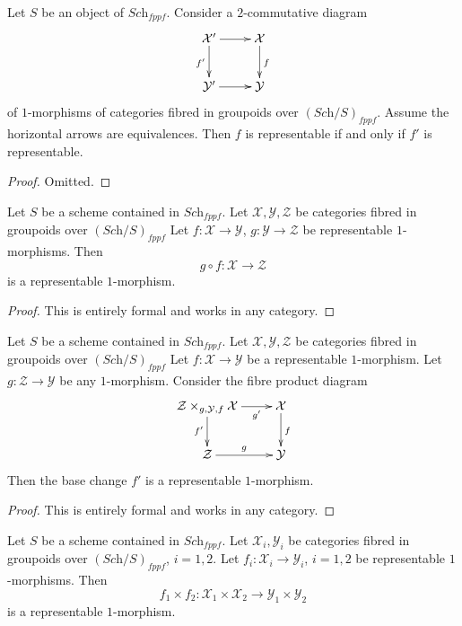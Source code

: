 \begin{lemma}
\label{lemma-representable-morphism-equivalent}
Let $S$ be an object of $\textit{Sch}_{fppf}$.
Consider a $2$-commutative diagram
$$
\xymatrix{
\mathcal{X}' \ar[r] \ar[d]_{f'} & \mathcal{X} \ar[d]^f \\
\mathcal{Y}' \ar[r] & \mathcal{Y}
}
$$
of $1$-morphisms of categories fibred in groupoids over
$(\textit{Sch}/S)_{fppf}$.
Assume the horizontal arrows are equivalences.
Then $f$ is representable if and only if $f'$ is representable.
\end{lemma}

\begin{proof}
Omitted.
\end{proof}

\begin{lemma}
\label{lemma-composition-representable-transformations}
Let $S$ be a scheme contained in $\textit{Sch}_{fppf}$.
Let $\mathcal{X}, \mathcal{Y}, \mathcal{Z}$
be categories fibred in groupoids over $(\textit{Sch}/S)_{fppf}$
Let $f : \mathcal{X} \to \mathcal{Y}$, $g : \mathcal{Y} \to \mathcal{Z}$
be representable $1$-morphisms. Then
$$
g \circ f : \mathcal{X} \longrightarrow \mathcal{Z}
$$
is a representable $1$-morphism.
\end{lemma}

\begin{proof}
This is entirely formal and works in any category.
\end{proof}

\begin{lemma}
\label{lemma-base-change-representable-transformations}
Let $S$ be a scheme contained in $\textit{Sch}_{fppf}$.
Let $\mathcal{X}, \mathcal{Y}, \mathcal{Z}$
be categories fibred in groupoids over $(\textit{Sch}/S)_{fppf}$
Let $f : \mathcal{X} \to \mathcal{Y}$ be a representable $1$-morphism.
Let $g : \mathcal{Z} \to \mathcal{Y}$ be any $1$-morphism.
Consider the fibre product diagram
$$
\xymatrix{
\mathcal{Z} \times_{g, \mathcal{Y}, f} \mathcal{X} \ar[r]_-{g'} \ar[d]_{f'} &
\mathcal{X} \ar[d]^f \\
\mathcal{Z} \ar[r]^g & \mathcal{Y}
}
$$
Then the base change $f'$ is a representable $1$-morphism.
\end{lemma}

\begin{proof}
This is entirely formal and works in any category.
\end{proof}

\begin{lemma}
\label{lemma-product-representable-transformations}
Let $S$ be a scheme contained in $\textit{Sch}_{fppf}$.
Let $\mathcal{X}_i, \mathcal{Y}_i$ be categories fibred in groupoids over
$(\textit{Sch}/S)_{fppf}$, $i = 1, 2$.
Let $f_i : \mathcal{X}_i \to \mathcal{Y}_i$, $i = 1, 2$
be representable $1$-morphisms.
Then
$$
f_1 \times f_2 :
\mathcal{X}_1 \times \mathcal{X}_2
\longrightarrow
\mathcal{Y}_1 \times \mathcal{Y}_2
$$
is a representable $1$-morphism.
\end{lemma}

